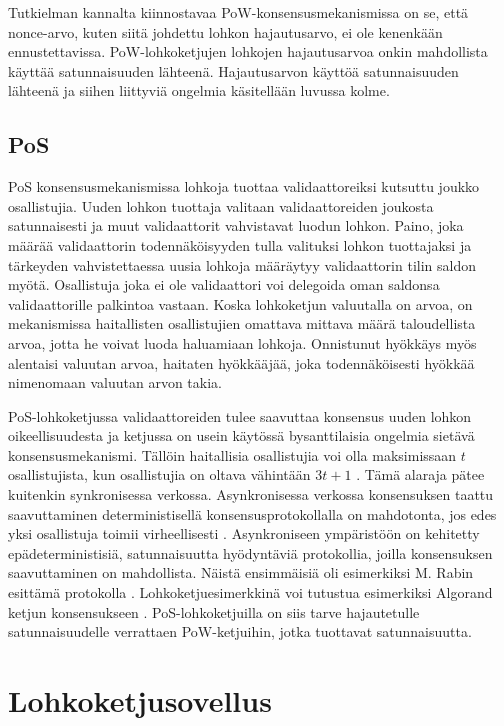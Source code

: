 Tutkielman kannalta kiinnostavaa PoW-konsensusmekanismissa on se, että nonce-arvo, kuten siitä johdettu lohkon hajautusarvo, ei ole kenenkään ennustettavissa. PoW-lohkoketjujen lohkojen hajautusarvoa onkin mahdollista käyttää satunnaisuuden lähteenä. Hajautusarvon käyttöä satunnaisuuden lähteenä ja siihen liittyviä ongelmia käsitellään luvussa kolme.

\subsection{PoS}

PoS konsensusmekanismissa lohkoja tuottaa validaattoreiksi kutsuttu joukko osallistujia. Uuden lohkon tuottaja valitaan validaattoreiden joukosta satunnaisesti ja muut validaattorit vahvistavat luodun lohkon. Paino, joka määrää validaattorin todennäköisyyden tulla valituksi lohkon tuottajaksi ja tärkeyden vahvistettaessa uusia lohkoja määräytyy validaattorin tilin saldon myötä. Osallistuja joka ei ole validaattori voi delegoida oman saldonsa validaattorille palkintoa vastaan. Koska lohkoketjun valuutalla on arvoa, on mekanismissa haitallisten osallistujien omattava mittava määrä taloudellista arvoa, jotta he voivat luoda haluamiaan lohkoja. Onnistunut hyökkäys myös alentaisi valuutan arvoa, haitaten hyökkääjää, joka todennäköisesti hyökkää nimenomaan valuutan arvon takia.

PoS-lohkoketjussa validaattoreiden tulee saavuttaa konsensus uuden lohkon oikeellisuudesta ja ketjussa on usein käytössä bysanttilaisia ongelmia sietävä konsensusmekanismi. Tällöin haitallisia osallistujia voi olla maksimissaan $t$ osallistujista, kun osallistujia on oltava vähintään $3t + 1$ \cite{10.1145/322186.322188}. Tämä alaraja pätee kuitenkin synkronisessa verkossa. Asynkronisessa verkossa konsensuksen taattu saavuttaminen deterministisellä konsensusprotokollalla on mahdotonta, jos edes yksi osallistuja toimii virheellisesti \cite{fischer_impossibility_1985}. Asynkroniseen ympäristöön on kehitetty epädeterministisiä, satunnaisuutta hyödyntäviä protokollia, joilla konsensuksen saavuttaminen on mahdollista. Näistä ensimmäisiä oli esimerkiksi M. Rabin esittämä protokolla \cite{10.1109/SFCS.1983.48}. Lohkoketjuesimerkkinä voi tutustua esimerkiksi Algorand ketjun konsensukseen \cite{gilad_algorand_2017}. PoS-lohkoketjuilla on siis tarve hajautetulle satunnaisuudelle verrattaen PoW-ketjuihin, jotka tuottavat satunnaisuutta.

\section{Lohkoketjusovellus}

